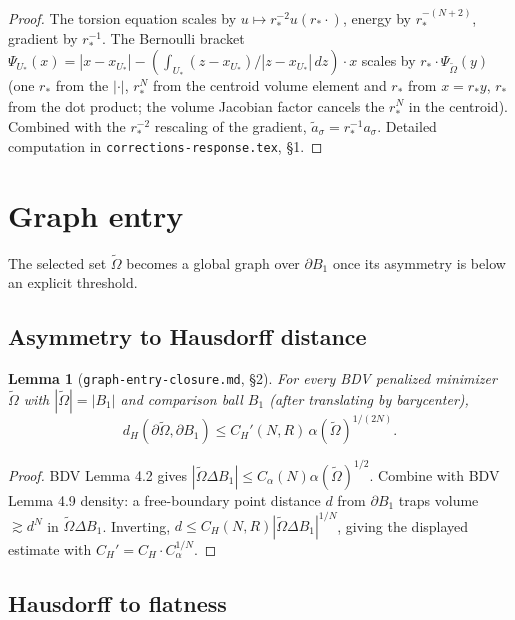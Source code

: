 \documentclass[11pt]{article}
\newtheorem{lemma}[theorem]{Lemma}
\theoremstyle{definition}
\newcommand{\abs}[1]{\left|#1\right|}
\renewcommand{\d}{\,d}
\begin{document}
\begin{proof}
The torsion equation scales by $u\mapsto r_*^{-2}u(r_*\cdot)$, energy by
$r_*^{-(N+2)}$, gradient by $r_*^{-1}$. The Bernoulli bracket
$\Psi_{U_*}(x)=\abs{x-x_{U_*}}-(\int_{U_*}(z-x_{U_*})/\abs{z-x_{U_*}}\d z)\cdot x$
scales by $r_*\cdot\Psi_{\widetilde\Omega}(y)$ (one $r_*$ from the
$\abs{\cdot}$, $r_*^N$ from the centroid volume element and $r_*$ from $x=r_*y$,
$r_*$ from the dot product; the volume Jacobian factor cancels the $r_*^N$ in the
centroid). Combined with the $r_*^{-2}$ rescaling of the gradient,
$\widetilde a_\sigma=r_*^{-1}a_\sigma$. Detailed computation in
\texttt{corrections-response.tex}, \S 1.
\end{proof}

\section{Graph entry}\label{sec:graphentry}

The selected set $\widetilde\Omega$ becomes a global graph over $\partial B_1$
once its asymmetry is below an explicit threshold.

\subsection{Asymmetry to Hausdorff distance}

\begin{lemma}[\texttt{graph-entry-closure.md}, \S 2]\label{lem:alphaH}
For every BDV penalized minimizer $\widetilde\Omega$ with
$\abs{\widetilde\Omega}=\abs{B_1}$ and comparison ball $B_1$ (after
translating by barycenter),
\[
d_H(\partial\widetilde\Omega,\partial B_1)
\le C_H'(N,R)\,\alpha(\widetilde\Omega)^{1/(2N)}.
\]
\end{lemma}

\begin{proof}
BDV Lemma 4.2 gives
$\abs{\widetilde\Omega\Delta B_1}\le C_\alpha(N)\alpha(\widetilde\Omega)^{1/2}$.
Combine with BDV Lemma 4.9 density: a free-boundary point distance $d$ from
$\partial B_1$ traps volume $\gtrsim d^N$ in $\widetilde\Omega\Delta B_1$.
Inverting, $d\le C_H(N,R)\abs{\widetilde\Omega\Delta B_1}^{1/N}$, giving the
displayed estimate with $C_H'=C_H\cdot C_\alpha^{1/N}$.
\end{proof}

\subsection{Hausdorff to flatness}
\end{document}
